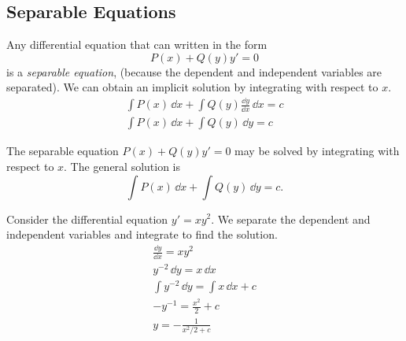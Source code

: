 \subsection{Separable Equations}




Any differential equation that can written in the form
\[ 
P(x) + Q(y) y' = 0
\]
is a \textit{separable equation}, (because the dependent and independent
variables are separated).  We can obtain an implicit solution by integrating
with respect to $x$.
\begin{gather*}
  \int P(x) \,\dd x + \int Q(y) \frac{\dd y}{\dd x} \,\dd x = c 
  \\
  \int P(x) \,\dd x + \int Q(y) \,\dd y = c
\end{gather*}



\begin{Result}
  The separable equation $P(x) + Q(y) y' = 0$ may be solved by integrating
  with respect to $x$.  The general solution is
  \[ 
  \int P(x) \,\dd x + \int Q(y) \,\dd y = c.
  \]
\end{Result}



\begin{Example}
  Consider the differential equation $y' = x y^2$.
  We separate the dependent and independent variables and integrate to find
  the solution.
  \begin{gather*}
    \frac{\dd y}{\dd x} = x y^2 
    \\
    y^{-2}\,\dd y = x\,\dd x 
    \\
    \int y^{-2}\,\dd y = \int x \,\dd x + c 
    \\
    -y^{-1} = \frac{x^2}{2} + c 
    \\
    \boxed{
      y = - \frac{1}{x^2/2 + c}
      }
  \end{gather*}
\end{Example}







